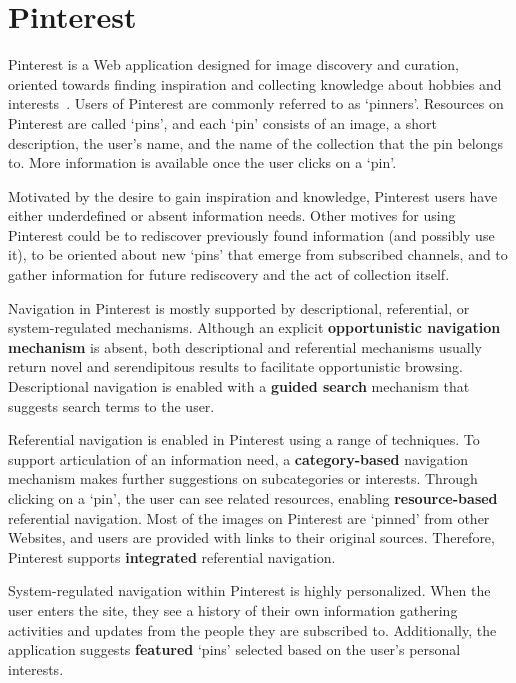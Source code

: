 {\section{Pinterest}
Pinterest is a Web application designed for image discovery and curation, oriented towards finding inspiration and collecting knowledge about hobbies and interests~\cite{gilbert2013need,zarro2012pinterest,ottoni2013ladies}.  Users of Pinterest are commonly referred to as `pinners'. Resources on Pinterest are called `pins', and each `pin' consists of an image, a short description, the user's name, and the name of the collection that the pin belongs to. More information is available once the user clicks on a `pin'.

Motivated by the desire to gain inspiration and knowledge, Pinterest users have either underdefined or absent information needs. Other motives for using Pinterest could be to rediscover previously found information (and possibly use it), to be oriented about new `pins' that emerge from subscribed channels, and to gather information for future rediscovery and the act of collection itself.

\pagebreak
Navigation in Pinterest is mostly supported by descriptional, referential, or system-regulated mechanisms. Although an explicit \textbf{opportunistic navigation mechanism} is absent, both descriptional and referential mechanisms usually return novel and serendipitous results to facilitate opportunistic browsing. Descriptional navigation is enabled with a \textbf{guided search} mechanism that suggests search terms to the user. 

Referential navigation is enabled in Pinterest using a range of techniques. To support articulation of an information need, a \textbf{category-based} navigation mechanism makes further suggestions on subcategories or interests. Through clicking on a `pin', the user can see related resources, enabling \textbf{resource-based} referential navigation. Most of the images on Pinterest are `pinned' from other Websites, and users are provided with links to their original sources. Therefore, Pinterest supports \textbf{integrated} referential navigation.

System-regulated navigation within Pinterest is highly personalized. When the user enters the site, they see a history of their own information gathering activities and updates from the people they are subscribed to. Additionally, the application suggests \textbf{featured} `pins' selected based on the user's personal interests.

}
